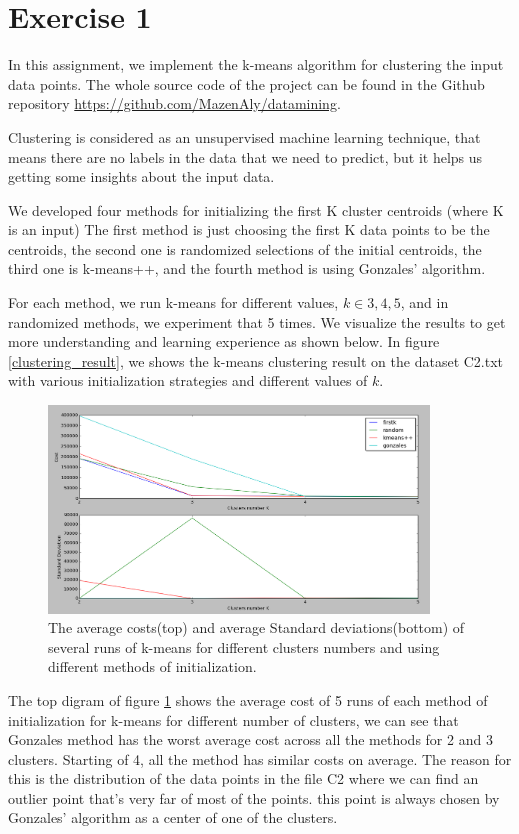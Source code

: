 \section*{Exercise 1}
In this assignment, we implement the k-means algorithm for clustering the input data points. The whole source code of the project can be found in the Github repository \url{https://github.com/MazenAly/datamining}.

Clustering is considered as an unsupervised machine learning technique, that means there are no labels in the data that we need to predict, but it helps us getting some insights about the input data.

We developed four methods for initializing the first K cluster centroids (where K is an input)
The first method is just choosing the first K data points to be the centroids, the second one is randomized selections of the initial centroids, the third one is k-means++,
and the fourth method is using Gonzales’ algorithm.

For each method, we run k-means for different values, $k \in {3,4,5}$, and in randomized methods, we experiment that 5 times. We visualize the results to get more understanding and learning experience as shown below. In figure \ref{clustering_result}, we shows the k-means clustering result on the dataset C2.txt with various initialization strategies and different values of $k$.

\begin{figure}[!htb]
\centering
\includegraphics[width=0.9\textwidth]{shots/std_mean.png}
\caption{The average costs(top) and average Standard deviations(bottom) of several runs of k-means for different clusters numbers and using different methods of initialization.}
\label{std_mean}
\end{figure}

The top digram of figure \ref{std_mean} shows the average cost of 5 runs of each method of initialization for k-means for different number of clusters, we can see that Gonzales method has the worst average cost across all the methods for 2 and 3 clusters. Starting of 4, all the method has similar costs on average. The reason for this is the distribution of the data points in the file C2 where we can find an outlier point that's very far of most of the points. this point is always chosen by Gonzales' algorithm as a center of one of the clusters.

